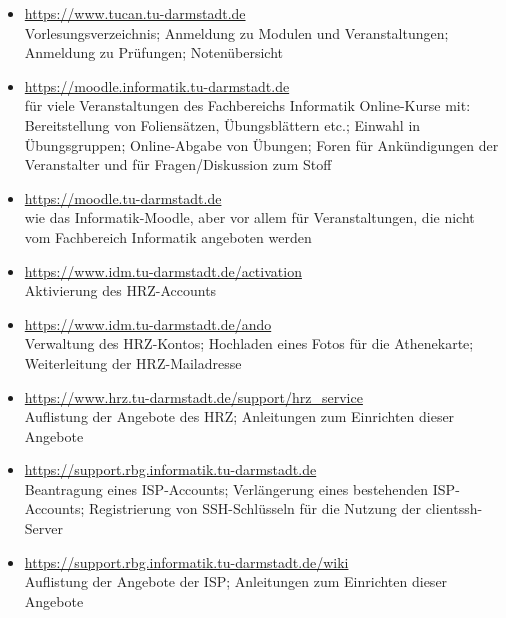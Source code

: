 
\vspace{5mm}

\begin{itemize}
    \item \url{https://www.tucan.tu-darmstadt.de}\\
        Vorlesungsverzeichnis; Anmeldung zu Modulen und Veranstaltungen; Anmeldung zu Prüfungen; Notenübersicht
    \item \url{https://moodle.informatik.tu-darmstadt.de}\\
        für viele Veranstaltungen des Fachbereichs Informatik Online-Kurse mit: Bereitstellung von Foliensätzen, Übungsblättern etc.; Einwahl in Übungsgruppen; Online-Abgabe von Übungen; Foren für Ankündigungen der Veranstalter und für Fragen/Diskussion zum Stoff
    \item \url{https://moodle.tu-darmstadt.de}\\
        wie das Informatik-Moodle, aber vor allem für Veranstaltungen, die nicht vom Fachbereich Informatik angeboten werden
    \item \url{https://www.idm.tu-darmstadt.de/activation}\\
        Aktivierung des HRZ-Accounts
    \item \url{https://www.idm.tu-darmstadt.de/ando}\\
        Verwaltung des HRZ-Kontos; Hochladen eines Fotos für die Athenekarte; Weiterleitung der HRZ-Mailadresse
    \item \url{https://www.hrz.tu-darmstadt.de/support/hrz_service}\\
        Auflistung der Angebote des HRZ; Anleitungen zum Einrichten dieser Angebote
    \item \url{https://support.rbg.informatik.tu-darmstadt.de}\\
        Beantragung eines ISP-Accounts; Verlängerung eines bestehenden ISP-Accounts; Registrierung von SSH-Schlüsseln für die Nutzung der clientssh-Server
    \item \url{https://support.rbg.informatik.tu-darmstadt.de/wiki}\\
        Auflistung der Angebote der ISP; Anleitungen zum Einrichten dieser Angebote

\end{itemize}
